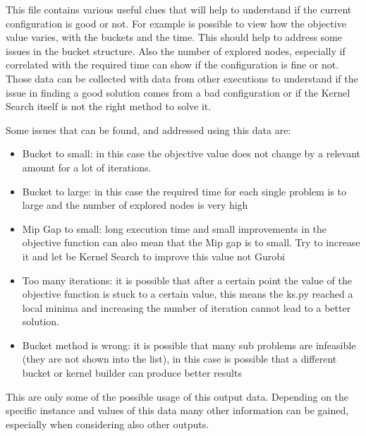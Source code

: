         This file contains various useful clues that will help to understand if the current configuration is good or not. For example is possible to view how the 
        objective value varies, with the buckets and the time. This should help to address some issues in the bucket structure. Also the number of explored nodes, especially
        if correlated with the required time can show if the configuration is fine or not. Those data can be collected with data from other executions
        to understand if the issue in finding a good solution comes from a bad configuration or if the Kernel Search itself is not the right method to solve it.

        Some issues that can be found, and addressed using this data are:
        \begin{itemize}
            \item Bucket to small: in this case the objective value does not change by a relevant amount for a lot of iterations.
            \item Bucket to large: in this case the required time for each single problem is to large and the number of explored nodes is very high
            \item Mip Gap to small: long execution time and small improvements in the objective function can also mean that the Mip gap is to small. Try to increase it and let
            be Kernel Search to improve this value not Gurobi
            \item Too many iterations: it is possible that after a certain point the value of the objective function is stuck to a certain value, this means the ks.py reached a
            local minima and increasing the number of iteration cannot lead to a better solution. 
            \item Bucket method is wrong: it is possible that many sub problems are infeasible (they are not shown into the list), in this case is possible that a different 
            bucket or kernel builder can produce better results
        \end{itemize}


        This are only some of the possible usage of this output data. Depending on the specific instance and values of this data many other information can be gained, especially
        when considering also other outputs.

